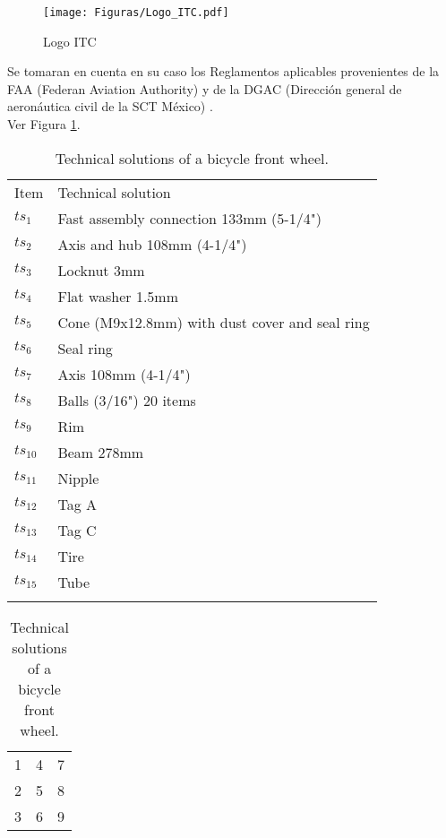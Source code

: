 \begin{figure}[h]
 \centering
 \texttt{[image: Figuras/Logo\_ITC.pdf]}
 \caption{Logo ITC}
 \label{Fig_ITC}
\end{figure}

Se tomaran en cuenta en su caso los Reglamentos aplicables provenientes de la FAA  (Federan Aviation Authority) y de la DGAC  (Dirección general de aeronáutica civil de la SCT  México) \cite{Morgan}.\\

Ver Figura \ref{Fig_ITC}.

\begin{table}[t]
\caption{Technical solutions of a bicycle front wheel.}  
\begin{center}
\label{TSwell}
  \begin{tabular}{lp{6cm}}
\hline\noalign{\smallskip}
Item & Technical solution\\
\noalign{\smallskip}\hline\noalign{\smallskip}
$ts_1$ & Fast assembly connection 133mm (5-1/4") \\
$ts_2$ & Axis and hub 108mm (4-1/4")\\
$ts_3$ & Locknut 3mm\\
$ts_4$ & Flat washer 1.5mm\\
$ts_5$ & Cone (M9x12.8mm) with dust cover and seal ring\\
$ts_6$ & Seal ring\\
$ts_7$ & Axis 108mm (4-1/4")\\
$ts_8$ & Balls (3/16") 20 items\\
$ts_9$ & Rim\\
$ts_{10}$ & Beam 278mm\\
$ts_{11}$ & Nipple\\
$ts_{12}$ & Tag A\\
$ts_{13}$ & Tag C\\
$ts_{14}$ & Tire\\
$ts_{15}$ & Tube\\
\noalign{\smallskip}\hline
\end{tabular}
    \end{center}
\end{table}

\begin{table}[t]
\caption{Technical solutions of a bicycle front wheel.} 
\begin{center}
\begin{tabular}{lll}
1 & 4 & 7\\
2 & 5 & 8\\
3 & 6 & 9
\end{tabular}
\end{center}
\end{table}